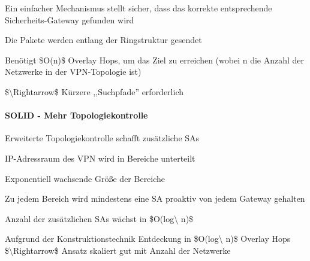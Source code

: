 \documentclass[a4paper]{article}
\begin{document}
\begin{multicols}{3}
\begin{itemize*}
\begin{itemize*}
                  \begin{itemize*}
                        \item Ein einfacher Mechanismus stellt sicher, dass das korrekte entsprechende Sicherheits-Gateway gefunden wird
                        \item Die Pakete werden entlang der Ringstruktur gesendet
                        \item Benötigt \$O(n)\$ Overlay Hops, um das Ziel zu erreichen (wobei n die Anzahl der Netzwerke in der VPN-Topologie ist)
                  \end{itemize*}
                  \item
                  \$\textbackslash Rightarrow\$ Kürzere ,,Suchpfade'' erforderlich
            \end{itemize*}


            \paragraph{SOLID - Mehr
                  Topologiekontrolle}

            \begin{itemize*}
                  \item
                  Erweiterte Topologiekontrolle schafft zusätzliche SAs
                  \item
                  IP-Adressraum des VPN wird in Bereiche unterteilt

                  \begin{itemize*}
                        \item Exponentiell wachsende Größe der Bereiche
                  \end{itemize*}
                  \item
                  Zu jedem Bereich wird mindestens eine SA proaktiv von jedem Gateway
                  gehalten
                  \item
                  Anzahl der zusätzlichen SAs wächst in \$O(log\textbackslash{} n)\$
                  \item
                  Aufgrund der Konstruktionstechnik Entdeckung in
                  \$O(log\textbackslash{} n)\$ Overlay Hops
                  \$\textbackslash Rightarrow\$ Ansatz skaliert gut mit Anzahl der
                  Netzwerke
            \end{itemize*}



\end{itemize*}
\end{multicols}
\end{document}
